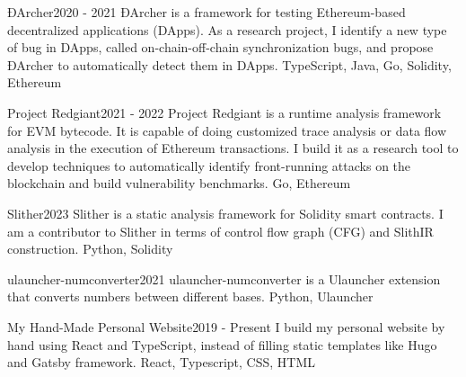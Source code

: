 %
%
%


\begin{projects}
	\project
	{ĐArcher}{2020 - 2021}
	{}
	{ĐArcher is a framework for testing Ethereum-based decentralized applications (DApps). As a research project, I identify a new type of bug in DApps, called on-chain-off-chain synchronization bugs, and propose ĐArcher to automatically detect them in DApps.}
	{TypeScript, Java, Go, Solidity, Ethereum}

	\project
	{Project Redgiant}{2021 - 2022}
	{}
	{Project Redgiant is a runtime analysis framework for EVM bytecode. It is capable of doing customized trace analysis or data flow analysis in the execution of Ethereum transactions. I build it as a research tool to develop techniques to automatically identify front-running attacks on the blockchain and build vulnerability benchmarks.}
	{Go, Ethereum}

	\project
	{Slither}{2023}
	{}
	{Slither is a static analysis framework for Solidity smart contracts. I am a contributor to Slither in terms of control flow graph (CFG) and SlithIR construction.}
	{Python, Solidity}

	\project
	{ulauncher-numconverter}{2021}
	{}
	{ulauncher-numconverter is a Ulauncher extension that converts numbers between different bases.}
	{Python, Ulauncher}

	\project
	{My Hand-Made Personal Website}{2019 - Present}
	{}
	{I build my personal website by hand using React and TypeScript, instead of filling static templates like Hugo and Gatsby framework.}
	{React, Typescript, CSS, HTML}

\end{projects}
